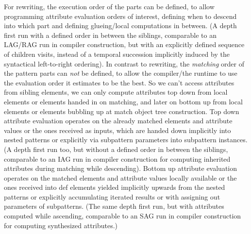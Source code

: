 \begin{note}
For rewriting, the execution order of the parts can be defined, to allow programming attribute evaluation orders of interest, defining when to descend into which part and defining glueing/local computations in between.
(A depth first run with a defined order in between the siblings, comparable to an LAG/RAG run in compiler construction, but with an explicitly defined sequence of children visits, instead of a temporal succession implicitly induced by the syntactical left-to-right ordering).
In contrast to rewriting, the \emph{matching} order of the pattern parts can \emph{not} be defined, to allow the compiler/the runtime to use the evaluation order it estimates to be the best.
So we can't access attributes from sibling elements, we can only compute attributes top down from local elements or elements handed in on matching, and later on bottom up from local elements or elements bubbling up at match object tree construction.
Top down attribute evaluation operates on the already matched elements and attribute values or the ones received as inputs, which are handed down implicitly into nested patterns or explicitly via subpattern parameters into subpattern instances. (A depth first run too, but without a defined order in between the siblings, comparable to an IAG run in compiler construction for computing inherited attributes during matching while descending).
Bottom up attribute evaluation operates on the matched elements and attribute values locally available or the ones received into def elements yielded implicitly upwards from the nested patterns or explicitly accumulating iterated results or with assigning out parameters of subpatterns. (The same depth first run, but with attributes computed while ascending, comparable to an SAG run in compiler construction for computing synthesized attributes.)
\end{note}

